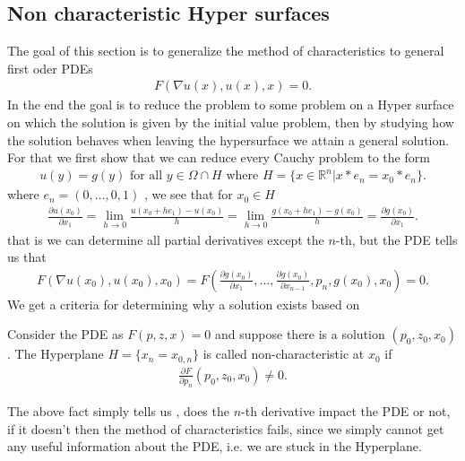 \subsection{Non characteristic Hyper surfaces }
The goal of this section is to generalize the method of characteristics to general first oder PDEs 
\begin{align*}
  F(\nabla u(x),u(x),x)=0
.\end{align*}
In the end the goal is to reduce the problem to some problem on a Hyper surface on which the solution is given by the initial value problem, then by studying how the solution behaves when leaving the hypersurface
we attain a general solution. For that we first show that we can reduce every Cauchy problem  to the form 
\begin{align*}
  u(y) = g(y) \text{ for all } y \in  \Omega  \cap H \text{ where } H = \{x \in  \mathbb{R}^{n} | x*e_n  = x_{0}*e_n \}  
.\end{align*}
where  $e_n = (0,\ldots ,0,1)$ , we see that for $x_{0} \in  H$
\begin{align*}
  \frac{\partial u(x_{0})}{\partial x_{1}}  = \lim_{h\to 0} \frac{u(x_{0}+he_{1})-u(x_{0})}{h} = \lim_{h \to 0} \frac{g(x_{0}+he_{1})-g(x_{0})}{h} = \frac{\partial g(x_{0})}{\partial x_{1}} 
.\end{align*}
that is we can determine all partial derivatives except the $n$-th, but the PDE tells us that 
\begin{align*}
  F(\nabla u(x_{0}),u(x_{0}),x_{0} ) = F(\frac{\partial g(x_{0})}{\partial x_{1}},\ldots ,\frac{\partial g(x_{0})}{\partial x_{n-1}},p_n,g(x_{0}),x_{0}  ) = 0
.\end{align*}
We get a criteria for determining why a solution exists based on 
\begin{Definition}[1.6]
  Consider the PDE as $F(p,z,x) = 0$  and suppose there is a solution $(p_{0},z_{0},x_{0})$. The Hyperplane $H = \{x_n = x_{0,n}\}  $ is called non-characteristic at $x_{0}$ if 
  \begin{align*}
    \frac{\partial F}{\partial p_n}(p_{0},z_{0},x_{0}) \neq 0
  .\end{align*}
\end{Definition}
\begin{note}
 The above fact simply tells us , does the $n$-th derivative impact the PDE or not, if it doesn't  
 then the method of characteristics fails, since we simply cannot get any useful information about the PDE, i.e.
 we are stuck in the Hyperplane.
\end{note}
